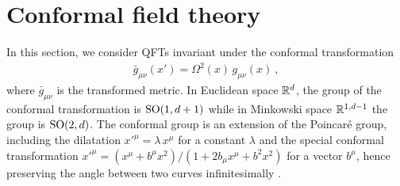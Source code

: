 \section{Conformal field theory}\label{ss:CFT}

In this section, we consider QFTs invariant under the conformal transformation
\begin{align}\label{ConfTra}
\bar g_{\mu\nu}(x') = \Omega^2 (x)\, g_{\mu\nu}(x) \ ,
\end{align}
where $\bar g_{\mu\nu}$ is the transformed metric.
In Euclidean space $\mathbb{R}^{d}$, the group of the conformal transformation is $\mathrm{SO} (1,d+1)$ while in Minkowski space $\mathbb{R}^{1,d-1}$ the group is $\mathrm{SO} (2,d)$.
The conformal group is an extension of the Poincar{\'e} group, including the dilatation $x'^\mu = \lambda\, x^\mu$ for a constant $\lambda$ and the special conformal transformation $x'^\mu = (x^\mu + b^\mu x^2)/(1+ 2b_\mu x^\mu + b^2 x^2)$ for a vector $b^\mu$, hence preserving the angle between two curves infinitesimally \cite{DiFrancesco:1997nk}.


